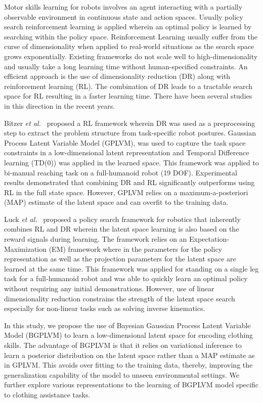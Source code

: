 \documentclass{article}
\begin{document}
Motor skills learning for robots involves an agent interacting with a partially observable environment in continuous state and action spaces. Usually policy search reinforcement learning is applied wherein an optimal policy is learned by searching within the policy space. Reinforcement Learning usually suffer from the curse of dimensionality when applied to real-world situations as the search space grows exponentially. Existing frameworks do not scale well to high-dimensionality and usually take a long learning time without human-specified constraints. An efficient approach is the use of dimensionality reduction (DR) along with reinforcement learning (RL). The combination of DR leads to a tractable search space for RL resulting in a faster learning time. There have been several studies in this direction in the recent years.

Bitzer \emph{et al.}~\cite{bitzer} proposed a RL framework wherein DR was used as a preprocessing step to extract the problem structure from task-specific robot postures. Gaussian Process Latent Variable Model (GPLVM), was used to capture the task space constraints in a low-dimensional latent representation and Temporal Difference learning (TD(0)) was applied in the learned space. This framework was applied to bi-manual reaching task on a full-humanoid robot (19 DOF). Experimental results demonstrated that combining DR and RL significantly outperforms using RL in the full state space. However, GPLVM relies on a maximum-a-posteriori (MAP) estimate of the latent space and can overfit to the training data.

Luck \emph{et al.}~\cite{luck} proposed a policy search framework for robotics that inherently combines RL and DR wherein the latent space learning is also based on the reward signals during learning. The framework relies on an Expectation-Maximization (EM) framework where in the parameters for the policy representation as well as the projection parameters for the latent space are learned at the same time. This framework was applied for standing on a single leg task for a full-humanoid robot and was able to quickly learn an optimal policy without requiring any initial demonstrations. However, use of linear dimensionality reduction constrains the strength of the latent space search especially for non-linear tasks such as solving inverse kinematics.

In this study, we propose the use of Bayesian Gaussian Process Latent Variable Model (BGPLVM) to learn a low-dimensional latent space for encoding clothing skills. The advantage of BGPLVM is that it relies on variational inference to learn a posterior distribution on the latent space rather than a MAP estimate as in GPLVM. This avoids over fitting to the training data, thereby, improving the generalization capability of the model to unseen environmental settings. We further explore various representations to the learning of BGPLVM model specific to clothing assistance tasks.
\end{document}
